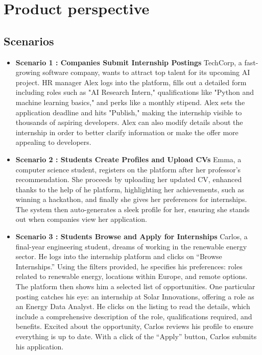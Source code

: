 \section{Product perspective}
\label{sec:product_perspective}%



\subsection{Scenarios}
\label{subsec:scenarios}%
\begin{itemize}
    \item \textbf{Scenario 1 : Companies Submit Internship Postings}
TechCorp, a fast-growing software company, wants to attract top talent for its upcoming AI project. HR manager Alex logs into the platform, fills out a detailed form including roles such as "AI Research Intern," qualifications like "Python and machine learning basics," and perks like a monthly stipend. Alex sets the application deadline and hits "Publish," making the internship visible to thousands of aspiring developers. 
Alex can also modify details about the internship in order to better clarify information or make the offer more appealing to developers.

    \item \textbf{Scenario 2 : Students Create Profiles and Upload CVs}
Emma, a computer science student, registers on the platform after her professor’s recommendation. She proceeds by uploading her updated CV, enhanced thanks to the help of he platform, highlighting her achievements, such as winning a hackathon, and finally she gives her preferences for internships. The system then auto-generates a sleek profile for her, ensuring she stands out when companies view her application. 

    \item \textbf{Scenario 3 : Students Browse and Apply for Internships} 
Carlos, a final-year engineering student, dreams of working in the renewable energy sector. He logs into the internship platform and clicks on “Browse Internships.” Using the filters provided, he specifies his preferences: roles related to renewable energy, locations within Europe, and remote options.
The platform then shows him a selected list of opportunities. One particular posting catches his eye: an internship at Solar Innovations, offering a role as an Energy Data Analyst. He clicks on the listing to read the details, which include a comprehensive description of the role, qualifications required, and benefits.
Excited about the opportunity, Carlos reviews his profile to ensure everything is up to date. With a click of the “Apply” button, Carlos submits his application.


\end{itemize}
